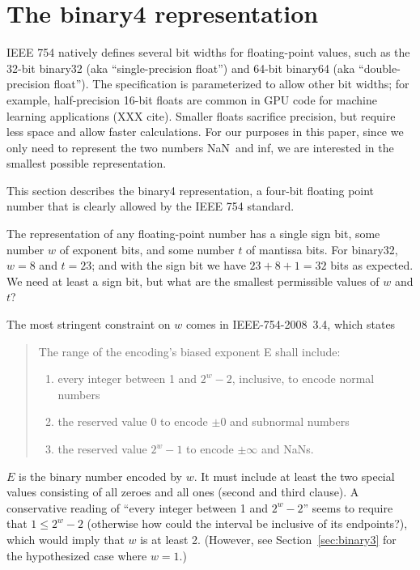 \documentclass[twocolumn]{article}
\newcommand\nan{\textsf{NaN}}
\renewcommand\inf{\textsf{inf}}
\newcommand\plusminus{\pm}
\begin{document}
\section{The binary4 representation}

IEEE 754 natively defines several bit widths for floating-point
values, such as the 32-bit binary32 (aka ``single-precision float'')
and 64-bit binary64 (aka ``double-precision float''). The
specification is parameterized to allow other bit widths; for example,
half-precision 16-bit floats are common in GPU code for machine
learning applications (XXX cite). Smaller floats sacrifice precision,
but require less space and allow faster calculations. For our purposes
in this paper, since we only need to represent the two numbers \nan\ and
\inf, we are interested in the smallest possible representation. 


This section describes the binary4 representation, a four-bit floating
point number that is clearly allowed by the IEEE 754 standard.

The representation of any floating-point number has a single sign bit,
some number $w$ of exponent bits, and some number $t$ of mantissa
bits. For binary32, $w = 8$ and $t = 23$; and with the sign bit we
have $23 + 8 + 1 = 32$ bits as expected. We need at least a sign bit,
but what are the smallest permissible values of $w$ and $t$?

The most stringent constraint on $w$ comes in IEEE-754-2008~3.4, which
states
\begin{quote}
  The range of the encoding's biased exponent E shall include:
  \begin{enumerate}[label=---]
    \item every integer between 1 and $2^w - 2$, inclusive, to encode
      normal numbers
    \item the reserved value 0 to encode $\plusminus 0$ and subnormal
      numbers
    \item the reserved value $2^w - 1$ to encode $\plusminus \infty$
      and NaNs.
  \end{enumerate}
\end{quote}

$E$ is the binary number encoded by $w$. It must include at least the
two special values consisting of all zeroes and all ones (second and
third clause). A conservative reading of ``every integer between 1 and
$2^w - 2$'' seems to require that $1 \leq 2^w - 2$ (otherwise how
could the interval be inclusive of its endpoints?), which would imply
that $w$ is at least 2. (However, see Section~\ref{sec:binary3} for
the hypothesized case where $w=1$.)
\end{document}
